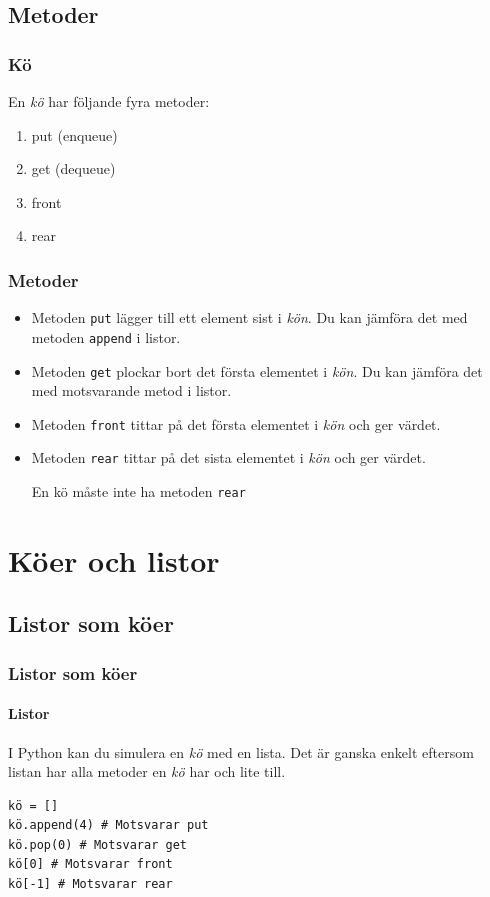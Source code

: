 \documentclass[aspectratio=169]{beamer}
\begin{document}
\subsection{Metoder}

\begin{frame}
	\frametitle{Kö}
	
	En \textit{kö} har följande fyra metoder:
	
	\begin{enumerate}
		\item put (enqueue)
		\item get (dequeue)
		\item front
		\item rear
	\end{enumerate}
	
\end{frame}


\begin{frame}
	\frametitle{Metoder}
	
	\begin{itemize}[<+->]
		\item Metoden \texttt{put} lägger till ett element sist i \textit{kön}. Du kan jämföra det med metoden \texttt{append} i listor.
		
		\item Metoden \texttt{get} plockar bort det första elementet i \textit{kön}. Du kan jämföra det med motsvarande metod i listor.
		
		\item Metoden \texttt{front} tittar på det första elementet i \textit{kön} och ger värdet.
	
		\item Metoden \texttt{rear} tittar på det sista elementet i \textit{kön} och ger värdet.
		
		En kö måste inte ha metoden \texttt{rear}
	\end{itemize}
	
\end{frame}


\section{Köer och listor}

\subsection{Listor som köer}

\begin{frame}[fragile]
	\frametitle{Listor som köer}
	\framesubtitle{Listor}

	I Python kan du simulera en \textit{kö} med en lista. Det är ganska enkelt eftersom listan har alla metoder en \textit{kö} har och lite till.
	
	\begin{lstlisting}
kö = []
kö.append(4) # Motsvarar put
kö.pop(0) # Motsvarar get
kö[0] # Motsvarar front
kö[-1] # Motsvarar rear
	\end{lstlisting}
	
\end{frame}
	
\end{document}

